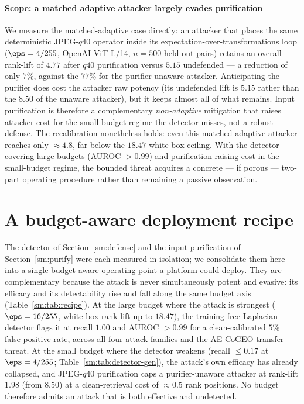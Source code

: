 \paragraph{Scope: a matched adaptive attacker largely evades purification} We measure the matched-adaptive case directly: an attacker that places the same deterministic JPEG-$q40$ operator inside its expectation-over-transformations loop ($\eps = 4/255$, OpenAI ViT-L/14, $n = 500$ held-out pairs) retains an overall rank-lift of $4.77$ after $q40$ purification versus $5.15$ undefended --- a reduction of only $7\%$, against the $77\%$ for the purifier-unaware attacker. Anticipating the purifier does cost the attacker raw potency (its undefended lift is $5.15$ rather than the $8.50$ of the unaware attacker), but it keeps almost all of what remains. Input purification is therefore a complementary \emph{non-adaptive} mitigation that raises attacker cost for the small-budget regime the detector misses, not a robust defense. The recalibration nonetheless holds: even this matched adaptive attacker reaches only $\approx 4.8$, far below the $18.47$ white-box ceiling. With the detector covering large budgets (AUROC $>0.99$) and purification raising cost in the small-budget regime, the bounded threat acquires a concrete --- if porous --- two-part operating procedure rather than remaining a passive observation.

\section{A budget-aware deployment recipe}
\label{sm:recipe}

The detector of Section~\ref{sm:defense} and the input purification of
Section~\ref{sm:purify} were each measured in isolation; we consolidate them here
into a single budget-aware operating point a platform could deploy. They are
complementary because the attack is never simultaneously potent and evasive: its
efficacy and its detectability rise and fall along the same budget axis
(Table~\ref{sm:tab:recipe}). At the large budget where the attack is strongest
($\eps = 16/255$, white-box rank-lift up to $18.47$), the training-free Laplacian
detector flags it at recall $1.00$ and AUROC $>0.99$ for a clean-calibrated $5\%$
false-positive rate, across all four attack families and the AE-CoGEO transfer
threat. At the small budget where the detector weakens (recall $\leq 0.17$ at
$\eps = 4/255$; Table~\ref{sm:tab:detector-gen}), the attack's own efficacy has
already collapsed, and JPEG-$q40$ purification caps a purifier-unaware attacker at
rank-lift $1.98$ (from $8.50$) at a clean-retrieval cost of $\approx 0.5$ rank
positions. No budget therefore admits an attack that is both effective and
undetected.

